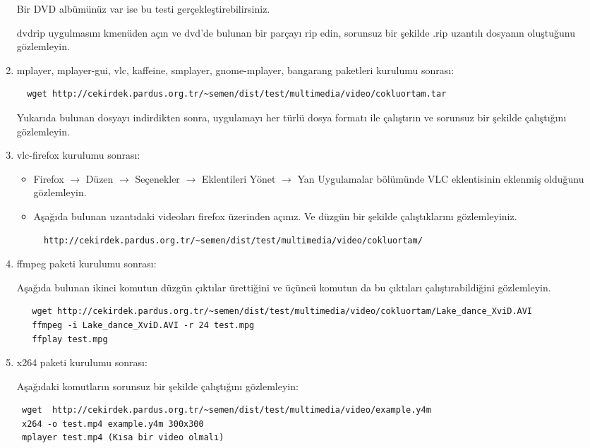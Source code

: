 \documentclass[a4paper,10pt]{article}
\begin{document}
\begin{enumerate}
Bir DVD albümünüz var ise bu testi gerçekleştirebilirsiniz.

dvdrip uygulmasını kmenüden açın ve dvd'de bulunan bir parçayı rip edin, sorunsuz bir şekilde .rip uzantılı dosyanın oluştuğunu gözlemleyin.
 \item mplayer, mplayer-gui, vlc, kaffeine, smplayer, gnome-mplayer, bangarang paketleri kurulumu sonrası:
 \begin{verbatim}
  wget http://cekirdek.pardus.org.tr/~semen/dist/test/multimedia/video/cokluortam.tar
 \end{verbatim}
Yukarıda bulunan dosyayı indirdikten sonra, uygulamayı her türlü dosya formatı ile çalıştırın ve sorunsuz bir şekilde çalıştığını gözlemleyin.
 \item vlc-firefox kurulumu sonrası:
 \begin{itemize}
  \item Firefox $\rightarrow$ Düzen $\rightarrow$ Seçenekler $\rightarrow$ Eklentileri Yönet $\rightarrow$ Yan Uygulamalar bölümünde VLC eklentisinin eklenmiş olduğunu gözlemleyin.
  \item Aşağıda bulunan uzantıdaki videoları firefox üzerinden açınız. Ve düzgün bir şekilde çalıştıklarını gözlemleyiniz.
  \begin{verbatim}
  http://cekirdek.pardus.org.tr/~semen/dist/test/multimedia/video/cokluortam/  
  \end{verbatim}
 \end{itemize}
\item ffmpeg paketi kurulumu sonrası:
 
Aşağıda bulunan ikinci komutun düzgün çıktılar ürettiğini ve üçüncü komutun da bu çıktıları çalıştırabildiğini gözlemleyin.
\begin{verbatim}
   wget http://cekirdek.pardus.org.tr/~semen/dist/test/multimedia/video/cokluortam/Lake_dance_XviD.AVI
   ffmpeg -i Lake_dance_XviD.AVI -r 24 test.mpg
   ffplay test.mpg
  \end{verbatim}
\item x264 paketi kurulumu sonrası:

Aşağıdaki komutların sorunsuz bir şekilde çalıştığını gözlemleyin:
\begin{verbatim}
 wget  http://cekirdek.pardus.org.tr/~semen/dist/test/multimedia/video/example.y4m
 x264 -o test.mp4 example.y4m 300x300 
 mplayer test.mp4 (Kısa bir video olmalı)
\end{verbatim}

\end{enumerate}
\end{document}

